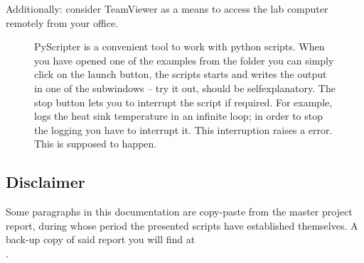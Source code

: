 Additionally:
consider TeamViewer 
as a means to access the lab computer
remotely from your office.

\begin{figure}
\centering
{}
\caption{PyScripter is a convenient tool
to work with python scripts.
When you have opened one of the examples
from the folder 
you can simply click on the launch button,
the scripts starts and
writes the output in one of the subwindows --
try it out, should be selfexplanatory.
The stop button
lets you to interrupt the script if required.
For example, 
logs the heat sink temperature in an infinite loop;
in order to stop the logging you have to interrupt it.
This interruption raises a  error.
This is supposed to happen.}
\label{img:pyscripter}
\end{figure}

\subsection{Disclaimer}

Some paragraphs in this documentation
are copy-paste from the master project report,
during whose period the presented scripts
have established themselves.
A back-up copy of said report
you will find at \\
.
